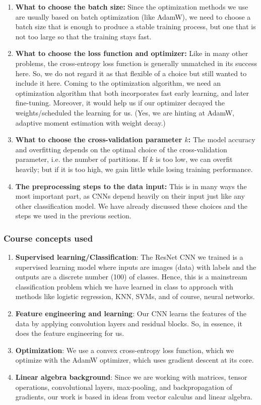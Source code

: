 \documentclass[10pt]{article} %
\begin{document}
\begin{enumerate}
  \item \textbf{What to choose the batch size:} Since the optimization methods we use are usually based on batch optimization (like AdamW), we need to choose a batch size that is enough to produce a stable training process, but one that is not too large so that the training stays fast.
  \item \textbf{What to choose the loss function and optimizer:} Like in many other problems, the cross-entropy loss function is generally unmatched in its success here. So, we do not regard it as that flexible of a choice but still wanted to include it here. Coming to the optimization algorithm, we need an optimization algorithm that both incorporates fast early learning, and later fine-tuning. Moreover, it would help us if our optimizer decayed the weights/scheduled the learning for us. (Yes, we are hinting at AdamW, adaptive moment estimation with weight decay.)
  \item \textbf{What to choose the cross-validation parameter $k$:} The model accuracy and overfitting depends on the optimal choice of the cross-validation parameter, i.e. the number of partitions. If $k$ is too low, we can overfit heavily; but if it is too high, we gain little while losing training performance.
  \item \textbf{The preprocessing steps to the data input:} This is in many ways the most important part, as CNNs depend heavily on their input just like any other classification model. We have already discussed these choices and the steps we used in the previous section.
\end{enumerate}

\subsubsection{Course concepts used}
\begin{enumerate}
  \item \textbf{Supervised learning/Classification}: The ResNet CNN we trained is a supervised learning model where inputs are images (data) with labels and the outputs are a discrete number (100) of classes. Hence, this is a mainstream classification problem which we have learned in class to approach with methods like logistic regression, KNN, SVMs, and of course, neural networks.
  \item \textbf{Feature engineering and learning}: Our CNN learns the features of the data by applying convolution layers and residual blocks. So, in essence, it does the feature engineering for us.
  \item \textbf{Optimization}: We use a convex cross-entropy loss function, which we optimize with the AdamW optimizer, which uses gradient descent at its core.
  \item \textbf{Linear algebra background}: Since we are working with matrices, tensor operations, convolutional layers, max-pooling, and backpropagation of gradients, our work is based in ideas from vector calculus and linear algebra.
\end{enumerate}
\end{document}
